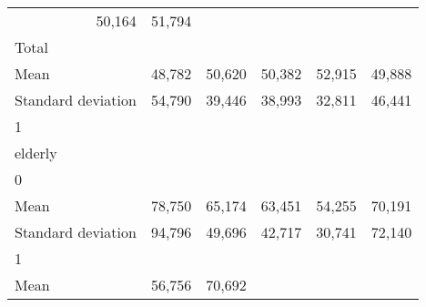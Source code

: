 \begin{tabular}{llllll}
  \multicolumn{1}{r}{50,164} &
  \multicolumn{1}{r}{51,794} \\
\multicolumn{1}{l}{\hspace{3em}Total} &
  \multicolumn{1}{|r}{} &
  \multicolumn{1}{r}{} &
  \multicolumn{1}{r}{} &
  \multicolumn{1}{r}{} &
  \multicolumn{1}{r}{} \\
\multicolumn{1}{l}{\hspace{4em}Mean} &
  \multicolumn{1}{|r}{48,782} &
  \multicolumn{1}{r}{50,620} &
  \multicolumn{1}{r}{50,382} &
  \multicolumn{1}{r}{52,915} &
  \multicolumn{1}{r}{49,888} \\
\multicolumn{1}{l}{\hspace{4em}Standard deviation} &
  \multicolumn{1}{|r}{54,790} &
  \multicolumn{1}{r}{39,446} &
  \multicolumn{1}{r}{38,993} &
  \multicolumn{1}{r}{32,811} &
  \multicolumn{1}{r}{46,441} \\
\multicolumn{1}{l}{\hspace{1em}1} &
  \multicolumn{1}{|r}{} &
  \multicolumn{1}{r}{} &
  \multicolumn{1}{r}{} &
  \multicolumn{1}{r}{} &
  \multicolumn{1}{r}{} \\
\multicolumn{1}{l}{\hspace{2em}elderly} &
  \multicolumn{1}{|r}{} &
  \multicolumn{1}{r}{} &
  \multicolumn{1}{r}{} &
  \multicolumn{1}{r}{} &
  \multicolumn{1}{r}{} \\
\multicolumn{1}{l}{\hspace{3em}0} &
  \multicolumn{1}{|r}{} &
  \multicolumn{1}{r}{} &
  \multicolumn{1}{r}{} &
  \multicolumn{1}{r}{} &
  \multicolumn{1}{r}{} \\
\multicolumn{1}{l}{\hspace{4em}Mean} &
  \multicolumn{1}{|r}{78,750} &
  \multicolumn{1}{r}{65,174} &
  \multicolumn{1}{r}{63,451} &
  \multicolumn{1}{r}{54,255} &
  \multicolumn{1}{r}{70,191} \\
\multicolumn{1}{l}{\hspace{4em}Standard deviation} &
  \multicolumn{1}{|r}{94,796} &
  \multicolumn{1}{r}{49,696} &
  \multicolumn{1}{r}{42,717} &
  \multicolumn{1}{r}{30,741} &
  \multicolumn{1}{r}{72,140} \\
\multicolumn{1}{l}{\hspace{3em}1} &
  \multicolumn{1}{|r}{} &
  \multicolumn{1}{r}{} &
  \multicolumn{1}{r}{} &
  \multicolumn{1}{r}{} &
  \multicolumn{1}{r}{} \\
\multicolumn{1}{l}{\hspace{4em}Mean} &
  \multicolumn{1}{|r}{56,756} &
  \multicolumn{1}{r}{70,692} &

\end{tabular}
